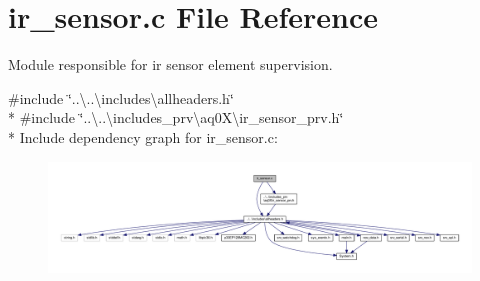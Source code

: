 \hypertarget{a00045}{\section{ir\+\_\+sensor.\+c File Reference}
\label{a00045}
}


Module responsible for ir sensor element supervision.  


{\ttfamily \#include \char`\"{}..\textbackslash{}..\textbackslash{}includes\textbackslash{}allheaders.\+h\char`\"{}}\\*
{\ttfamily \#include \char`\"{}..\textbackslash{}..\textbackslash{}includes\+\_\+prv\textbackslash{}aq0\+X\textbackslash{}ir\+\_\+sensor\+\_\+prv.\+h\char`\"{}}\\*
Include dependency graph for ir\+\_\+sensor.\+c\+:\nopagebreak
\begin{figure}[H]
\begin{center}
\leavevmode
\includegraphics[width=350pt]{d4/d12/a00910}
\end{center}
\end{figure}
